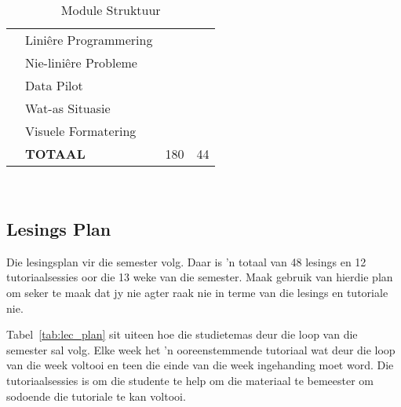 \begin{table}[!h]
\begin{tabular}{|p{1.4cm}|l|p{2cm}|p{2cm}|}
                    & \qquad Lini\^{e}re Programmering          &    &   \\
                    & \qquad Nie-lini\^{e}re Probleme  &    &   \\
                    & \qquad Data Pilot                         &    &   \\
                    & \qquad Wat-as Situasie                    &    &   \\
                    & \qquad Visuele Formatering                &    &   \\
                    & {\bf TOTAAL}                              &180 &44 \\
                 \hline
             \end{tabular}
             \caption{Module Struktuur} \label{tab:study_comp} \\
        \end{table}

    \subsection{Lesings Plan}
	Die lesingsplan vir die semester volg.  Daar is 'n totaal van 48 lesings en 12 
         tutoriaalsessies oor die 13 weke van die semester. Maak gebruik van
         hierdie plan om seker te maak dat jy nie agter raak nie in terme van die lesings
	en tutoriale nie.
	
	Tabel~\ref{tab:lec_plan} sit uiteen hoe die studietemas deur die loop van die semester sal volg.
	Elke week het 'n ooreenstemmende tutoriaal wat deur die loop van die week voltooi en teen die	
	einde van die week ingehanding moet word. Die tutoriaalsessies is om die studente te help om
	die materiaal te bemeester om sodoende die tutoriale te kan voltooi.
        
